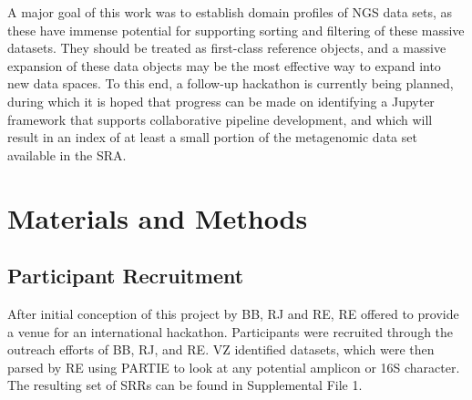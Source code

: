 A major goal of this work was to establish domain profiles of NGS data sets, as
these have immense potential for supporting sorting and filtering of these
massive datasets. They should be treated as first-class reference objects, and
a massive expansion of these data objects may be the most effective way to
expand into new data spaces. To this end, a follow-up hackathon is currently
being planned, during which it is hoped that progress can be made on
identifying a Jupyter framework that supports collaborative pipeline
development, and which will result in an index of at least a small portion of
the metagenomic data set available in the SRA.

\section{Materials and Methods}

  \subsection{Participant Recruitment}
  After initial conception of this project by BB, RJ and RE, RE offered to
  provide a venue for an international hackathon.  Participants were recruited
  through the outreach efforts of BB, RJ, and RE.  VZ identified datasets,
  which were then parsed by RE using PARTIE to look at any potential amplicon
  or 16S character. The resulting set of SRRs can be found in Supplemental
  File 1.

